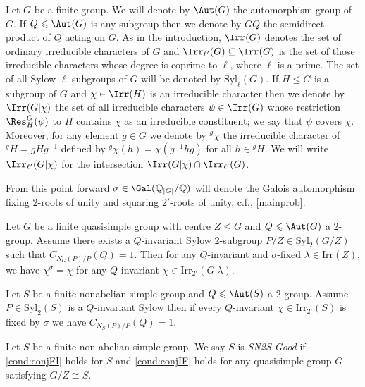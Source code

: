 \documentclass[eqthmnum, nocolour]{jt-calcs}
\newcommand{\syl}{\mathrm{Syl}}
\newcommand{\irr}{\mathrm{Irr}}
\begin{document}
\begin{pa}[Notation]
Let $G$ be a finite group. We will denote by $\Aut(G)$ the automorphism group of $G$. If $Q \leqslant \Aut(G)$ is any subgroup then we denote by $GQ$ the semidirect product of $Q$ acting on $G$. As in the introduction, $\Irr(G)$ denotes the set of ordinary irreducible characters of $G$ and $\Irr_{\ell'}(G) \subseteq \Irr(G)$ is the set of those irreducible characters whose degree is coprime to $\ell$, where $\ell$ is a prime. The set of all Sylow $\ell$-subgroups of $G$ will be denoted by $\syl_{\ell}(G)$. If $H \leqslant G$ is a subgroup of $G$ and $\chi \in \Irr(H)$ is an irreducible character then we denote by $\Irr(G|\chi)$ the set of all irreducible characters $\psi \in \Irr(G)$ whose restriction $\Res_H^G(\psi)$ to $H$ contains $\chi$ as an irreducible constituent; we say that $\psi$ covers $\chi$. Moreover, for any element $g \in G$ we denote by ${}^g\chi$ the irreducible character of ${}^gH = gHg^{-1}$ defined by ${}^g\chi(h) = \chi(g^{-1}hg)$ for all $h \in {}^gH$. We will write $\Irr_{\ell'}(G|\chi)$ for the intersection $\Irr(G|\chi) \cap \Irr_{\ell'}(G)$.
\end{pa}

\begin{assumption}
From this point forward $\sigma \in \Gal(\mathbb{Q}_{|G|}/\mathbb{Q})$ will denote the Galois automorphism fixing $2$-roots of unity and squaring $2'$-roots of unity, c.f., \cref{mainprob}.
\end{assumption}

\begin{condition}\label{cond:conjIF}
Let $G$ be a finite quasisimple group with centre $Z \leqslant G$ and $Q \leqslant \Aut(G)$ a $2$-group. Assume there exists a $Q$-invariant Sylow $2$-subgroup $P/Z\in \syl_2(G/Z)$ such that $C_{N_G(P)/P}(Q)=1$.  Then for any $Q$-invariant and $\sigma$-fixed $\lambda\in\irr(Z)$, we have $\chi^\sigma=\chi$ for any $Q$-invariant $\chi\in\irr_{2'}(G|\lambda)$.
\end{condition}

\begin{condition}\label{cond:conjFI}
Let $S$ be a finite nonabelian simple group and $Q \leqslant \Aut(S)$ a $2$-group. Assume $P \in \syl_2(S)$ is a $Q$-invariant Sylow then if every $Q$-invariant $\chi\in\irr_{2'}(S)$ is fixed by $\sigma$ we have $C_{N_S(P)/P}(Q)=1$.
\end{condition}

\begin{definition}\label{def:Goodness}
Let $S$ be a finite non-abelian simple group. We say $S$ is \emph{SN2S-Good} if \cref{cond:conjFI} holds for $S$ and \cref{cond:conjIF} holds for any quasisimple group $G$ satisfying $G/Z\cong S$.
\end{definition}
\end{document}
